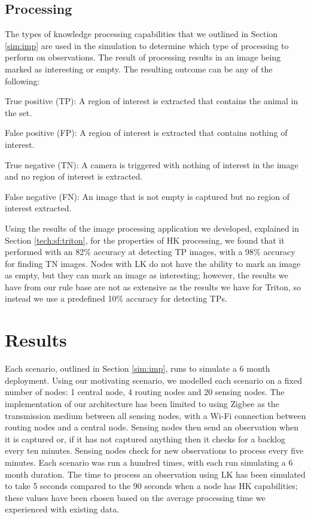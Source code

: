 \subsection{Processing}
	The types of knowledge processing capabilities that we outlined in Section \ref{sim:imp} are used in the simulation to determine which type of processing to perform on observations. The result of processing results in an image being marked as interesting or empty. The resulting outcome can be any of the following:
		\begin{description}
			\item True positive (TP): A region of interest is extracted that contains the animal in the set.
			\item False positive (FP): A region of interest is extracted that contains nothing of interest.
			\item True negative (TN): A camera is triggered with nothing of interest in the image and no region of interest is extracted.
			\item False negative (FN): An image that is not empty is captured but no region of interest extracted.
		\end{description}
	
	Using the results of the image processing application we developed, explained in Section \ref{tech:sf:triton}, for the properties of HK processing, we found that it performed with an 82\% accuracy at detecting TP images, with a 98\% accuracy for finding TN images. Nodes with LK do not have the ability to mark an image as empty, but they can mark an image as interesting; however, the results we have from our rule base are not as extensive as the results we have for Triton, so instead we use a predefined 10\% accuracy for detecting TPs.
	

\section{Results}
Each scenario, outlined in Section \ref{sim:imp}, runs to simulate a 6 month deployment. Using our motivating scenario, we modelled each scenario on a fixed number of nodes: 1 central node, 4 routing nodes and 20 sensing nodes. The implementation of our architecture has been limited to using Zigbee as the transmission medium between all sensing nodes, with a Wi-Fi connection between routing nodes and a central node. Sensing nodes then send an observation when it is captured or, if it has not captured anything then it checks for a backlog every ten minutes. Sensing nodes check for new observations to process every five minutes. Each scenario was run a hundred times, with each run simulating a 6 month duration. The time to process an observation using LK has been simulated to take 5 seconds compared to the 90 seconds when a node has HK capabilities; these values have been chosen based on the average processing time we experienced with existing data.


